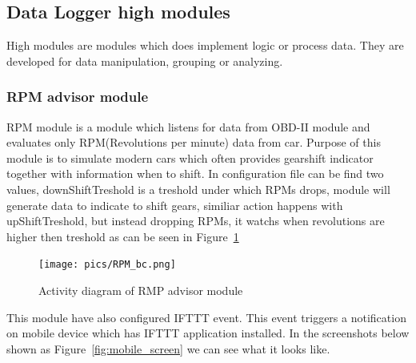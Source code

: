 \subsection{Data Logger high modules}

High modules are modules which does implement logic or process data. They are developed for data manipulation, grouping or analyzing.
\subsubsection{RPM advisor module} %
\label{ssub:rpm_module}
RPM module is a module which listens for data from OBD-II module and evaluates only RPM(Revolutions per minute) data from car. Purpose of this module is to simulate modern cars which often provides gearshift indicator together with information when to shift. In configuration file can be find two values, downShiftTreshold is a treshold under which RPMs drops, module will generate data to indicate to shift gears, similiar action happens with upShiftTreshold, but instead dropping RPMs, it watchs when revolutions are higher then treshold as can be seen in Figure~\ref{fig:rmp_pic} 
\begin{figure}[H]
\begin{center}
\captionsetup{font=small}
\texttt{[image: pics/RPM\_bc.png]}
\caption{Activity diagram of RMP advisor module}
\label{fig:rmp_pic}
\end{center}
\end{figure}
This module have also configured IFTTT event. This event triggers a notification on mobile device which has IFTTT application installed. In the screenshots below shown as Figure~\ref{fig:mobile_screen} we can see what it looks like.
